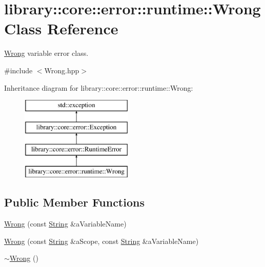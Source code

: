 \hypertarget{classlibrary_1_1core_1_1error_1_1runtime_1_1Wrong}{}\section{library\+:\+:core\+:\+:error\+:\+:runtime\+:\+:Wrong Class Reference}
\label{classlibrary_1_1core_1_1error_1_1runtime_1_1Wrong}


\hyperlink{classlibrary_1_1core_1_1error_1_1runtime_1_1Wrong}{Wrong} variable error class.  




{\ttfamily \#include $<$Wrong.\+hpp$>$}

Inheritance diagram for library\+:\+:core\+:\+:error\+:\+:runtime\+:\+:Wrong\+:\begin{figure}[H]
\begin{center}
\leavevmode
\includegraphics[height=4.000000cm]{classlibrary_1_1core_1_1error_1_1runtime_1_1Wrong}
\end{center}
\end{figure}
\subsection*{Public Member Functions}
\begin{DoxyCompactItemize}
\item 
\hyperlink{classlibrary_1_1core_1_1error_1_1runtime_1_1Wrong_acb341a0822b64bfa2d8cdf7963b24f96}{Wrong} (const \hyperlink{classlibrary_1_1core_1_1types_1_1String}{String} \&a\+Variable\+Name)
\item 
\hyperlink{classlibrary_1_1core_1_1error_1_1runtime_1_1Wrong_a413ec4868a4a3283cc0a1dcd2882ad1e}{Wrong} (const \hyperlink{classlibrary_1_1core_1_1types_1_1String}{String} \&a\+Scope, const \hyperlink{classlibrary_1_1core_1_1types_1_1String}{String} \&a\+Variable\+Name)
\item 
\hyperlink{classlibrary_1_1core_1_1error_1_1runtime_1_1Wrong_a6cdcfe31f32807b295695b9bd288d1cf}{$\sim$\+Wrong} ()
\end{DoxyCompactItemize}



